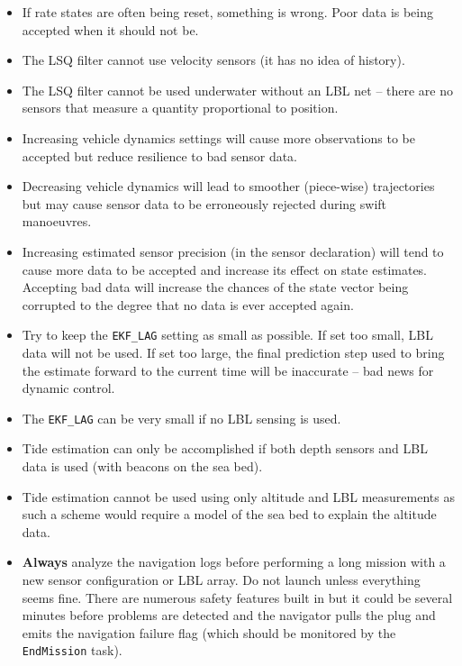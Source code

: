 \documentclass[a4paper,10pt]{article}
\newcommand{\Code}[1]{\texttt{#1} }
\newcommand{\code}[1]{\Code{#1} }
\begin{document}
\begin{itemize}

\item If rate states are often being reset, something is wrong.
Poor data is being accepted when it should not be.

\item The LSQ filter cannot use velocity sensors (it has no idea of
history).

\item The LSQ filter cannot be used underwater without an LBL net
-- there are no sensors that measure a quantity proportional to
position.

\item Increasing vehicle dynamics settings will cause more
observations to be accepted but reduce resilience to bad sensor
data.

\item Decreasing vehicle dynamics will lead to smoother (piece-wise)
trajectories but may cause sensor data to be erroneously rejected
during swift manoeuvres.

\item Increasing estimated sensor precision (in the sensor
declaration)  will tend to cause more data to be accepted and
increase its effect on state estimates. Accepting bad data will
increase the chances of the  state vector being corrupted to the
degree that no data is ever accepted again.

\item Try to keep the \code{EKF\_LAG} setting as small as
possible. If set too small, LBL data will not be used. If set too
large, the final prediction step used to bring the estimate forward
to the current time will be inaccurate -- bad news for dynamic
control.

\item The \code{EKF\_LAG} can be very small if no LBL sensing is
used.

\item Tide estimation can only be accomplished if both depth
sensors and LBL data is used (with beacons on the sea bed).

\item Tide estimation cannot be used using only altitude and LBL
measurements as such a scheme would require a model of the sea bed
to explain the altitude data.

\item \textbf{Always} analyze the navigation logs before
performing a long mission with a new sensor configuration or LBL
array. Do not launch unless everything seems fine. There are
numerous safety features built in but it could be several minutes
before problems are detected and the navigator pulls the plug and
emits the navigation failure flag (which should be monitored by
the \code{EndMission} task).



\end{itemize}
\end{document}
